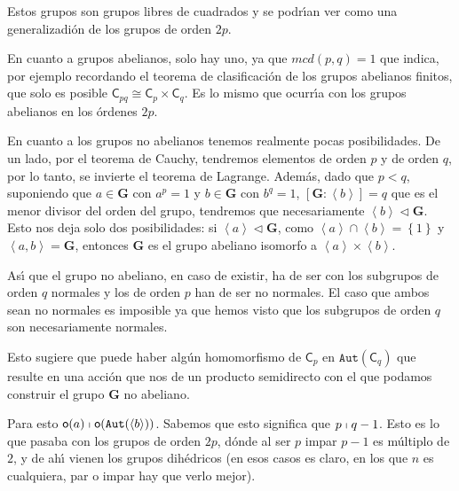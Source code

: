 \documentclass[final,12pt,a4paper,twoside,fleqn]{extbook}
\newcommand{\grclass}[1]{\ensuremath{\mathsf{#1}}}
\newcommand{\cyclicgr}[1]{\ensuremath{{\grclass{C}}_{#1}}}
\theoremstyle{definition}
\theoremstyle{remark}
\begin{document}
Estos grupos son grupos libres de cuadrados y se podr{\'{\i}}an ver como una generalizadi\'on de los grupos de orden $2p$.

En cuanto a grupos abelianos, solo hay uno, ya que $mcd(p,q)=1$ que indica, por ejemplo recordando el teorema de clasificaci\'on de los grupos abelianos finitos, que solo es posible $\cyclicgr{pq}             \cong             \cyclicgr{p}             \times             \cyclicgr{q}$. Es lo mismo que ocurr{\'{\i}}a con los grupos abelianos en los \'ordenes $2p$.

En cuanto a los grupos no abelianos tenemos realmente pocas posibilidades. De un lado, por el teorema de Cauchy, tendremos elementos de orden $p$ y de orden $q$, por lo tanto, se invierte el teorema de Lagrange. Adem\'as, dado que $p<q$, suponiendo que $a             \in \mathbf{G}$ con $a^p=1$ y $b             \in \mathbf{G}$ con $b^q=1$, $\left[\mathbf{G}:\left\langle b\right\rangle\right]=q$ que es el menor divisor del orden del grupo, tendremos que necesariamente $\left\langle{b}\right\rangle             \vartriangleleft             \mathbf{G}$. Esto nos deja solo dos posibilidades: si $\left\langle{a}\right\rangle             \vartriangleleft             \mathbf{G}$, como ${\left\langle{a}\right\rangle}             \cap {\left\langle{b}\right\rangle}={\left\lbrace{1}\right\rbrace}$ y  ${\left\langle{a,b}\right\rangle}={\mathbf{G}}$, entonces $\mathbf{G}$ es el grupo abeliano isomorfo a ${\left\langle{a}\right\rangle}             \times             {\left\langle{b}\right\rangle}$.

As{\'{\i}} que el grupo no abeliano, en caso de existir, ha de ser con los subgrupos de orden $q$ normales y los de orden $p$ han de ser no normales. El caso que ambos sean no normales es imposible ya que hemos visto que los subgrupos de orden $q$ son necesariamente normales.

Esto sugiere que puede haber algún homomorfismo de $\cyclicgr{p}$ en $\mathtt{Aut}\left(\cyclicgr{q}\right)$ que resulte en una acci\'on que nos de un producto semidirecto con el que podamos construir el grupo $\mathbf{G}$ no abeliano.

Para esto $\mathsf{o}(a) \shortmid \mathsf{o}(\mathtt{Aut}(\langle b \rangle))$. Sabemos que esto significa que $p \shortmid q-1$. Esto es lo que pasaba con los grupos de orden $2p$, d\'onde al ser $p$ impar $p-1$ es m\'ultiplo de $2$, y de ah{\'{\i}} vienen los grupos dih\'edricos (en esos casos es claro, en los que $n$ es cualquiera, par o impar hay que verlo mejor).
\end{document}
